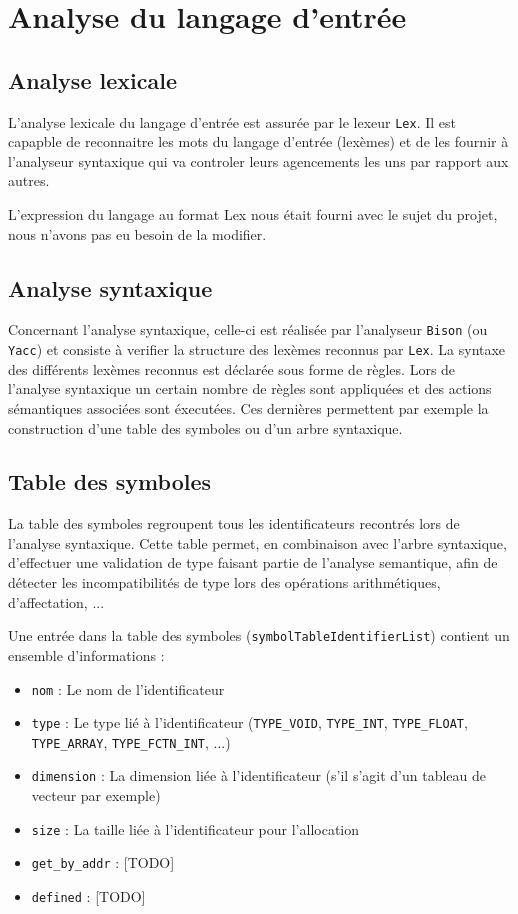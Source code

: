 \newpage
\section{Analyse du langage d'entrée}
\subsection{Analyse lexicale}

L'analyse lexicale du langage d'entrée est assurée par le lexeur \verb?Lex?. Il est capapble de reconnaitre les mots du langage d'entrée (lexèmes) et de les fournir à l'analyseur syntaxique qui va controler leurs agencements les uns par rapport aux autres.

L'expression du langage au format Lex nous était fourni avec le sujet du projet, nous n'avons pas eu besoin de la modifier.


\subsection{Analyse syntaxique}

Concernant l'analyse syntaxique, celle-ci est réalisée par l'analyseur \verb?Bison? (ou \verb?Yacc?) et consiste à verifier la structure des lexèmes reconnus par \verb?Lex?.
La syntaxe des différents lexèmes reconnus est déclarée sous forme de règles. Lors de l'analyse syntaxique un certain nombre de règles sont appliquées et des actions sémantiques associées sont éxecutées. Ces dernières permettent par exemple la construction d'une table des symboles ou d'un arbre syntaxique.

\subsection{Table des symboles}

La table des symboles regroupent tous les identificateurs recontrés lors de l'analyse syntaxique. 
Cette table permet, en combinaison avec l'arbre syntaxique, d'effectuer une validation de type faisant partie de l'analyse semantique, afin de détecter les incompatibilités de type lors des opérations arithmétiques, d'affectation, ... 

Une entrée dans la table des symboles (\verb?symbolTableIdentifierList?) contient un ensemble d'informations :

\begin{itemize}
\item \verb?nom? : Le nom de l'identificateur
\item \verb?type? : Le type lié à l'identificateur (\verb?TYPE_VOID?, \verb?TYPE_INT?, \verb?TYPE_FLOAT?, \verb?TYPE_ARRAY?, \verb?TYPE_FCTN_INT?, ...)
\item \verb?dimension? : La dimension liée à l'identificateur (s'il s'agit d'un tableau de vecteur par exemple)
\item \verb?size? : La taille liée à l'identificateur pour l'allocation
\item \verb?get_by_addr? : [TODO]
\item \verb?defined? : [TODO]
\end{itemize}

